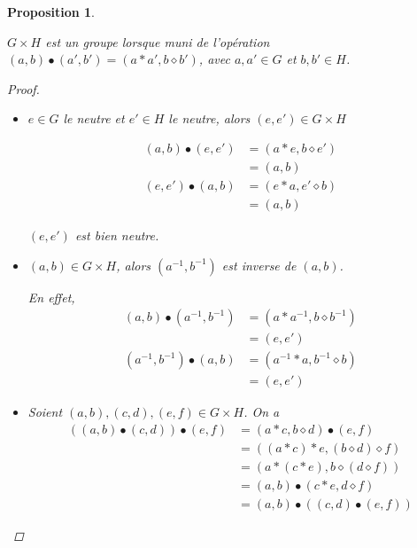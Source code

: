 \documentclass{report}
\newtheorem*{prop}{Proposition}
\theoremstyle{definition}
\theoremstyle{remark}
\begin{document}
	\begin{prop}
		~

		$G \times H$ est un groupe lorsque muni de l'op\'eration $(a,b) \bullet (a',b') = (a*a',b \diamond b')$, avec $a,a' \in G$ et $b,b' \in H$.
		\begin{proof}~

			\begin{itemize}
				\item[(N)] $e \in G$ le neutre et $e' \in H$ le neutre, alors $(e,e') \in G \times H$

				\begin{align*}
					(a,b) \bullet (e,e')&= (a*e, b \diamond e')\\
					&= (a,b)\\
					(e,e') \bullet (a,b)&= (e*a, e' \diamond b)\\
					&= (a,b)
				\end{align*}

				$(e,e')$ est bien neutre.
				\item[(I)] $(a,b) \in G \times H$, alors $(a^{-1},b^{-1})$ est inverse de $(a,b)$.

				En effet,
				\begin{align*}
					(a,b) \bullet (a^{-1},b^{-1})&= (a*a^{-1},b \diamond b^{-1})\\
					&= (e,e')\\
					(a^{-1},b^{-1}) \bullet (a,b)&= (a^{-1}*a,b^{-1} \diamond b)\\
					&= (e,e')
				\end{align*}
				\item[(A)] Soient $(a,b), (c,d), (e,f) \in G \times H$. On a
				\begin{align*}
					((a,b) \bullet (c,d)) \bullet (e,f)&= (a*c,b \diamond d) \bullet (e,f)\\
					&= ((a*c)*e,(b \diamond d) \diamond f)\\
					&= (a*(c*e),b \diamond (d \diamond f))\\
					&= (a,b) \bullet (c*e,d \diamond f)\\
					&= (a,b) \bullet ((c,d) \bullet (e,f))
				\end{align*}
			\end{itemize}
		\end{proof}
	\end{prop}
\end{document}
